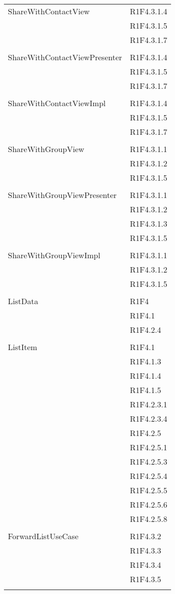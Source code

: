 \begin{center}
\begin{longtable}{|p{7cm}|p{5cm}|}
		ShareWithContactView & R1F4.3.1.4 \\ & R1F4.3.1.5 \\ & R1F4.3.1.7 \\ & \\ \hline
		ShareWithContactViewPresenter & R1F4.3.1.4 \\ & R1F4.3.1.5 \\ & R1F4.3.1.7 \\ & \\ \hline
		ShareWithContactViewImpl & R1F4.3.1.4 \\ & R1F4.3.1.5 \\ & R1F4.3.1.7 \\ & \\ \hline
		ShareWithGroupView & R1F4.3.1.1 \\ & R1F4.3.1.2 \\ & R1F4.3.1.5 \\ & \\ \hline
		ShareWithGroupViewPresenter & R1F4.3.1.1 \\ & R1F4.3.1.2 \\ & R1F4.3.1.3 \\ & R1F4.3.1.5 \\ & \\ \hline
		ShareWithGroupViewImpl & R1F4.3.1.1 \\ & R1F4.3.1.2 \\ & R1F4.3.1.5 \\ & \\ \hline
		ListData & R1F4 \\ & R1F4.1 \\ & R1F4.2.4 \\ & \\ \hline
		ListItem & R1F4.1 \\ & R1F4.1.3 \\ & R1F4.1.4 \\ & R1F4.1.5 \\ & R1F4.2.3.1 \\ & R1F4.2.3.4 \\ & R1F4.2.5 \\ & R1F4.2.5.1 \\ & R1F4.2.5.3 \\ & R1F4.2.5.4 \\ & R1F4.2.5.5 \\ & R1F4.2.5.6 \\ & R1F4.2.5.8 \\ & \\ \hline
		ForwardListUseCase & R1F4.3.2 \\ & R1F4.3.3 \\ & R1F4.3.4 \\ & R1F4.3.5 \\ & \\ \hline

\end{longtable}
\end{center}
